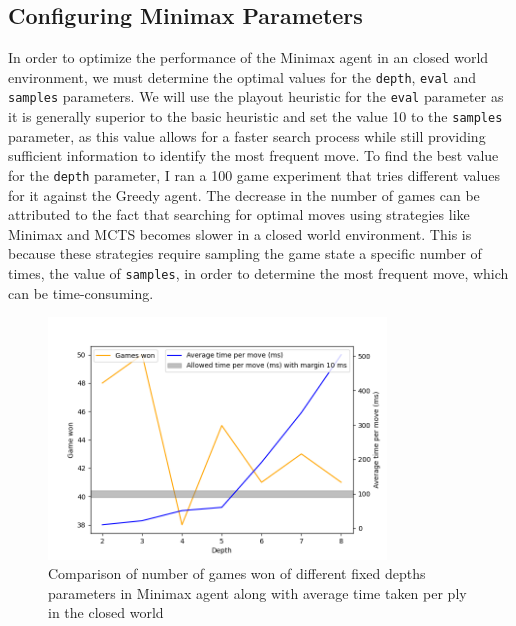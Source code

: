 \subsection{Configuring Minimax Parameters}

In order to optimize the performance of the Minimax agent in an closed world environment, we must determine the optimal values for the \texttt{depth}, \texttt{eval} and \texttt{samples} parameters. We will use the playout heuristic for the \texttt{eval} parameter as it is generally superior to the basic heuristic and set the value 10 to the \texttt{samples} parameter, as this value allows for a faster search process while still providing sufficient information to identify the most frequent move. To find the best value for the \texttt{depth} parameter, I ran a 100 game experiment that tries different values for it against the Greedy agent. The decrease in the number of games can be attributed to the fact that searching for optimal moves using strategies like Minimax and MCTS becomes slower in a closed world environment. This is because these strategies require sampling the game state a specific number of times, the value of \texttt{samples}, in order to determine the most frequent move, which can be time-consuming.

\begin{figure}[h]
  \centering
  \captionsetup{justification=centering}
  \includegraphics[width=0.8\textwidth]{../img/minimax_depth_closedworld.png}
  \caption{Comparison of number of games won of different fixed depths parameters in Minimax agent along with average time taken per ply in the closed world}
  \label{minimaxCWDepth}
\end{figure}

